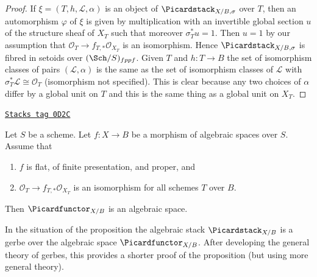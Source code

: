 \begin{proof}
If $\xi = (T, h, \mathcal{L}, \alpha)$
is an object of $\Picardstack_{X/B, \sigma}$
over $T$, then an automorphism $\varphi$ of
$\xi$ is given by multiplication with an invertible global section $u$
of the structure sheaf of $X_T$ such that moreover $\sigma_T^*u = 1$.
Then $u = 1$ by our assumption that
$\mathcal{O}_T \to f_{T, *}\mathcal{O}_{X_T}$ is an isomorphism.
Hence $\Picardstack_{X/B, \sigma}$
is fibred in setoids over $(\Sch/S)_{fppf}$.
Given $T$ and $h : T \to B$
the set of isomorphism classes of pairs $(\mathcal{L}, \alpha)$
is the same as the set of isomorphism classes of $\mathcal{L}$
with $\sigma_T^*\mathcal{L} \cong \mathcal{O}_T$ (isomorphism
not specified). This is clear because any two choices
of $\alpha$ differ by a global unit on $T$ and this is the
same thing as a global unit on $X_T$.
\end{proof}

\begin{proposition}
\label{quot-proposition-pic-functor}
\href{https://stacks.math.columbia.edu/tag/0D2C}{\texttt{Stacks tag 0D2C}}

Let $S$ be a scheme. Let $f : X \to B$ be a morphism of algebraic
spaces over $S$. Assume that
\begin{enumerate}
\item $f$ is flat, of finite presentation, and proper, and
\item $\mathcal{O}_T \to f_{T, *}\mathcal{O}_{X_T}$ is an isomorphism
for all schemes $T$ over $B$.
\end{enumerate}
Then $\Picardfunctor_{X/B}$ is an algebraic space.
\end{proposition}

In the situation of the proposition the algebraic stack
$\Picardstack_{X/B}$ is a gerbe over the algebraic space
$\Picardfunctor_{X/B}$. After developing the general
theory of gerbes, this provides a shorter proof of
the proposition (but using more general theory).

